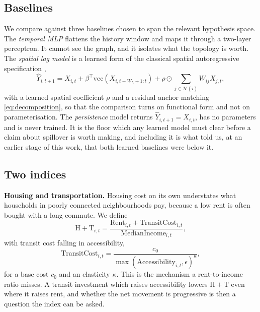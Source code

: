 \documentclass[journal]{IEEEtran}
\newcommand{\HT}{\mathrm{H}\!+\!\mathrm{T}}
\begin{document}
\subsection{Baselines}

We compare against three baselines chosen to span the relevant hypothesis space.
The \emph{temporal MLP} flattens the history window and maps it through a
two-layer perceptron. It cannot see the graph, and it isolates what the topology
is worth. The \emph{spatial lag model} is a learned form of the classical
spatial autoregressive specification \cite{anselin1988,lesage2009},
\begin{equation}
  \hat{Y}_{i,t+1} = X_{i,t} + \beta^{\top} \mathrm{vec}(X_{i,t-W_h+1:t})
  + \rho \odot \sum_{j \in \mathcal{N}(i)} W_{ij} X_{j,t},
  \label{eq:slm}
\end{equation}
with a learned spatial coefficient $\rho$ and a residual anchor matching
\eqref{eq:decomposition}, so that the comparison turns on functional form and
not on parameterisation. The \emph{persistence} model returns
$\hat{Y}_{i,t+1} = X_{i,t}$, has no parameters and is never trained. It is the
floor which any learned model must clear before a claim about spillover is worth
making, and including it is what told us, at an earlier stage of this work, that
both learned baselines were below it.

\subsection{Two indices}

\textbf{Housing and transportation.} Housing cost on its own understates what
households in poorly connected neighbourhoods pay, because a low rent is often
bought with a long commute. We define
\begin{equation}
  \HT_{i,t}
  = \frac{\mathrm{Rent}_{i,t} + \mathrm{TransitCost}_{i,t}}
         {\mathrm{MedianIncome}_{i,t}} ,
  \label{eq:ht}
\end{equation}
with transit cost falling in accessibility,
\begin{equation}
  \mathrm{TransitCost}_{i,t} =
  \frac{c_0}{\max(\mathrm{Accessibility}_{i,t}, \epsilon)^{\kappa}} ,
  \label{eq:transit}
\end{equation}
for a base cost $c_0$ and an elasticity $\kappa$. This is the mechanism a
rent-to-income ratio misses. A transit investment which raises accessibility
lowers $\HT$ even where it raises rent, and whether the net movement is
progressive is then a question the index can be asked.
\end{document}

